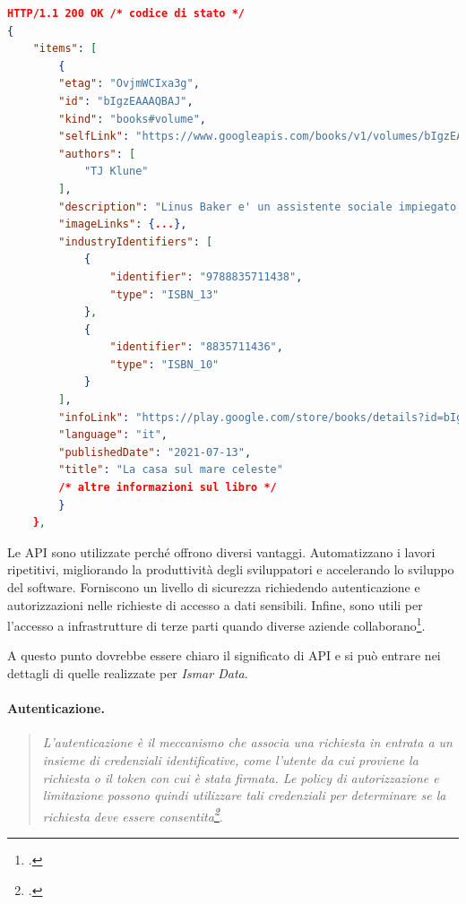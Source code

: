 \documentclass[./main.tex]{subfiles}
\begin{document}
\begin{lstlisting}[language=json, caption=risposta del server]
HTTP/1.1 200 OK /* codice di stato */
{
    "items": [
        { 
        "etag": "OvjmWCIxa3g",
        "id": "bIgzEAAAQBAJ",
        "kind": "books#volume",
        "selfLink": "https://www.googleapis.com/books/v1/volumes/bIgzEAAAQBAJ",
        "authors": [
            "TJ Klune"
        ],
        "description": "Linus Baker e' un assistente sociale impiegato al Dipartimento della Magia Minorile. [...] su cosa significhi accorgersi che, a volte, si puo' scegliere la vita che si vuole. E, se si e' abbastanza fortunati, magari quella vita ci sceglie a sua volta.",
        "imageLinks": {...},
        "industryIdentifiers": [
            {
                "identifier": "9788835711438",
                "type": "ISBN_13"
            },
            {
                "identifier": "8835711436",
                "type": "ISBN_10"
            }
        ],
        "infoLink": "https://play.google.com/store/books/details?id=bIgzEAAAQBAJ&source=gbs_api",
        "language": "it",
        "publishedDate": "2021-07-13",
        "title": "La casa sul mare celeste"
        /* altre informazioni sul libro */
        }
    },
\end{lstlisting}

Le API sono utilizzate perché offrono diversi vantaggi. Automatizzano i lavori ripetitivi, migliorando la produttività degli sviluppatori e accelerando lo sviluppo del software. Forniscono un livello di sicurezza richiedendo autenticazione e autorizzazioni nelle richieste di accesso a dati sensibili. Infine, sono utili per l'accesso a infrastrutture di terze parti quando diverse aziende collaborano\footcite[\url{https://www.postman.com/what-is-an-api/}]{website-postman}.

A questo punto dovrebbe essere chiaro il significato di API e si può entrare nei dettagli di quelle realizzate per \textit{Ismar Data}.

\paragraph{Autenticazione.}\label{subsec:auth}
\begin{quote}
\textit{L'autenticazione è il meccanismo che associa una richiesta in entrata a un insieme di credenziali identificative, come l'utente da cui proviene la richiesta o il token con cui è stata firmata.  Le policy di autorizzazione e limitazione possono quindi utilizzare tali credenziali per determinare se la richiesta deve essere consentita\footcite[\url{https://www.django-rest-framework.org/}]{website-django-rest-framwork}}.
\end{quote}
\end{document}
